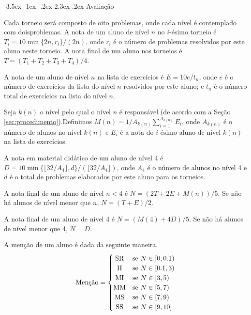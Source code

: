 \documentclass{UnBExam}%
\makeatletter
\renewcommand\section{\@startsection{section}{1}{\z@}%
	{-3.5ex \@plus -1ex \@minus -.2ex}%
	{2.3ex \@plus.2ex}%
	{\normalfont\normalsize\bfseries}}%
\newenvironment{my_itemize}%
{\begin{itemize}%
  \vspace{-0.3\baselineskip}
  \setlength{\itemsep}{1pt}%
  \setlength{\parskip}{0pt}%
  \setlength{\parsep}{0pt}}%
{\end{itemize}}
\makeatother
\begin{document}
	\section{Avaliação}%
		\begin{my_itemize}
			\item Cada torneio será composto de oito problemas, onde cada nível é contemplado com dois\break problemas. A nota de um aluno de nível $n$ no $i$-ésimo torneio é $T_i = 10 \min\{2n,r_i\}/(2n)$, onde $r_i$ é o número de problemas resolvidos por este aluno neste torneio. A nota final de um aluno nos torneios é $T = (T_1 + T_2 + T_3 + T_4)/4$.
			\item A nota de um aluno de nível $n$ na lista de exercícios é $E = 10 e/t_n$, onde $e$ é o número de exercícios da lista do nível $n$ resolvidos por este aluno; e $t_n$ é o número total de exercícios na lista do nível $n$.
			\item Seja $k(n)$ o nível pelo qual o nível $n$ é responsável (de acordo com a Seção \ref{sec:procedimento}).\break Definimos $M(n) = 1/A_{k(n)} \sum\limits_{i=1}^{A_{k(n)}} E_i$, onde $A_{k(n)}$ é o número de alunos no nível $k(n)$ e $E_i$ é a nota do $i$-ésimo aluno de nível $k(n)$ na lista de exercícios.
			\item A nota em material didático de um aluno de nível 4 é $D = 10 \min\{\lfloor 32/A_4 \rfloor,d\}/(\lfloor 32/A_4 \rfloor)$, onde $A_4$ é o número de alunos no nível 4 e $d$ é o total de problemas elaborados por este aluno para os torneios.
			\item A nota final de um aluno de nível $n < 4$ é $N=(2T + 2E + M(n))/5$. Se não há alunos de nível menor que $n$, $N=(T+E)/2$.
			\item A nota final de um aluno de nível 4 é $N=(M(4) + 4D)/5$. Se não há alunos de nível menor que 4, $N=D$.
			\item A menção de um aluno é dada da seguinte maneira.
			\[
			\text{Menção} =
				\begin{cases}
					\hfill \text{SR} \hfill & \text{se } N \in [0  ,0.1) \\
					\hfill \text{II} \hfill & \text{se } N \in [0.1,  3) \\
					\hfill \text{MI} \hfill & \text{se } N \in [  3,  5) \\
					\hfill \text{MM} \hfill & \text{se } N \in [  5,  7) \\
					\hfill \text{MS} \hfill & \text{se } N \in [  7,  9) \\
					\hfill \text{SS} \hfill & \text{se } N \in [  9, 10] \\
				\end{cases}
			\]
		\end{my_itemize}
		\vspace{-.5cm}
\vspace{-0.5cm}
\end{document}
